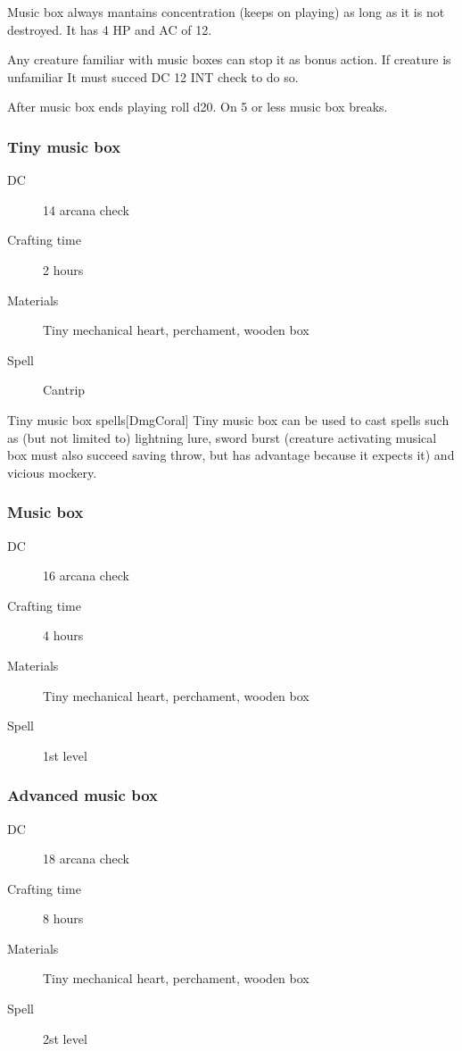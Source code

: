 Music box always mantains concentration (keeps on playing) as long as it is not destroyed. It has 4 HP and AC of 12.

Any creature familiar with music boxes can stop it as bonus action. If creature is unfamiliar It must succed DC 12 INT check to do so.

After music box ends playing roll d20. On 5 or less music box breaks.

\subsubsection{Tiny music box}

\begin{description}
\item [DC] 14 arcana check
\item [Crafting time] 2 hours
\item [Materials] Tiny mechanical heart, perchament, wooden box
\item [Spell] Cantrip
\end{description}

\begin{commentbox}{Tiny music box spells}[DmgCoral]
Tiny music box can be used to cast spells such as (but not limited to) lightning lure, sword burst (creature activating musical box must also succeed saving throw, but has advantage because it expects it) and vicious mockery. 
\end{commentbox}

\subsubsection{Music box}

\begin{description}
\item [DC] 16 arcana check
\item [Crafting time] 4 hours
\item [Materials] Tiny mechanical heart, perchament, wooden box
\item [Spell] 1st level
\end{description}

\subsubsection{Advanced music box}

\begin{description}
\item [DC] 18 arcana check
\item [Crafting time] 8 hours
\item [Materials] Tiny mechanical heart, perchament, wooden box
\item [Spell] 2st level
\end{description}

